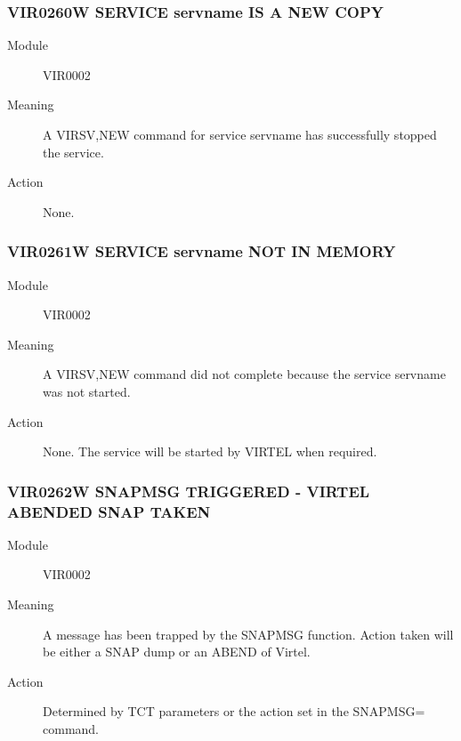 \documentclass[letterpaper,10pt,english]{sphinxmanual}
\begin{document}
\subsubsection{VIR0260W SERVICE servname IS A NEW COPY}
\label{\detokenize{messages:vir0260w-service-servname-is-a-new-copy}}\begin{description}
\item[{Module}] \leavevmode
VIR0002

\item[{Meaning}] \leavevmode
A VIRSV,NEW command for service servname has successfully stopped the service.

\item[{Action}] \leavevmode
None.

\end{description}


\subsubsection{VIR0261W SERVICE servname NOT IN MEMORY}
\label{\detokenize{messages:vir0261w-service-servname-not-in-memory}}\begin{description}
\item[{Module}] \leavevmode
VIR0002

\item[{Meaning}] \leavevmode
A VIRSV,NEW command did not complete because the service servname was not started.

\item[{Action}] \leavevmode
None. The service will be started by VIRTEL when required.

\end{description}


\subsubsection{VIR0262W SNAPMSG TRIGGERED - VIRTEL ABENDED \textbar{} SNAP TAKEN}
\label{\detokenize{messages:vir0262w-snapmsg-triggered-virtel-abended-snap-taken}}\begin{description}
\item[{Module}] \leavevmode
VIR0002

\item[{Meaning}] \leavevmode
A message has been trapped by the SNAPMSG function. Action taken will be either a SNAP dump or an ABEND of Virtel.

\item[{Action}] \leavevmode
Determined by TCT parameters or the action set in the SNAPMSG= command.

\end{description}
\end{document}
